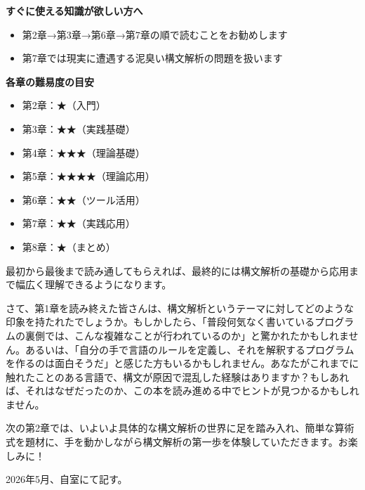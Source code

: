 \textbf{すぐに使える知識が欲しい方へ}

\begin{itemize}
\tightlist
\item
  第2章→第3章→第6章→第7章の順で読むことをお勧めします
\item
  第7章では現実に遭遇する泥臭い構文解析の問題を扱います
\end{itemize}

\textbf{各章の難易度の目安}

\begin{itemize}
\tightlist
\item
  第2章：★（入門）
\item
  第3章：★★（実践基礎）
\item
  第4章：★★★（理論基礎）
\item
  第5章：★★★★（理論応用）
\item
  第6章：★★（ツール活用）
\item
  第7章：★★（実践応用）
\item
  第8章：★（まとめ）
\end{itemize}

最初から最後まで読み通してもらえれば、最終的には構文解析の基礎から応用まで幅広く理解できるようになります。

さて、第1章を読み終えた皆さんは、構文解析というテーマに対してどのような印象を持たれたでしょうか。もしかしたら、「普段何気なく書いているプログラムの裏側では、こんな複雑なことが行われているのか」と驚かれたかもしれません。あるいは、「自分の手で言語のルールを定義し、それを解釈するプログラムを作るのは面白そうだ」と感じた方もいるかもしれません。あなたがこれまでに触れたことのある言語で、構文が原因で混乱した経験はありますか？もしあれば、それはなぜだったのか、この本を読み進める中でヒントが見つかるかもしれません。

次の第2章では、いよいよ具体的な構文解析の世界に足を踏み入れ、簡単な算術式を題材に、手を動かしながら構文解析の第一歩を体験していただきます。お楽しみに！

2026年5月、自室にて記す。


